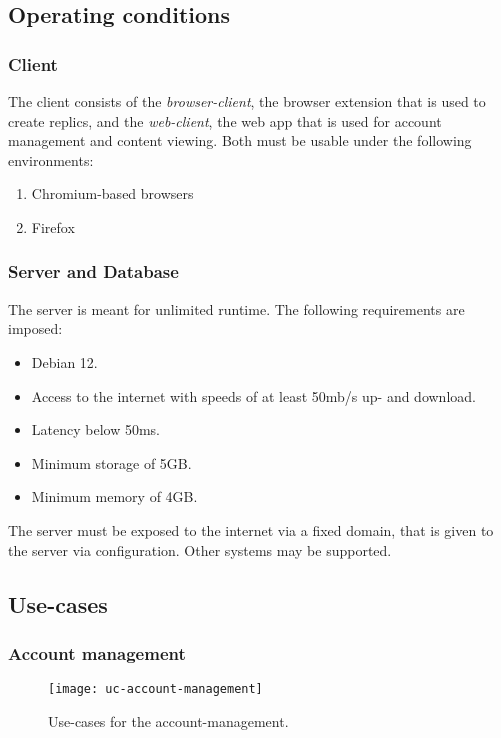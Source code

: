 \subsection{Operating conditions}\label{subsec:operating-conditions}

\subsubsection{Client}
The client consists of the \textit{browser-client}, the browser extension that is used to create replics, and the \textit{web-client}, the web app that is used for account management and content viewing.
Both must be usable under the following environments:

\begin{enumerate}
    \item Chromium-based browsers
    \item Firefox
\end{enumerate}

\subsubsection{Server and Database}
The server is meant for unlimited runtime.
The following requirements are imposed:
\begin{itemize}
    \item Debian 12.
    \item Access to the internet with speeds of at least 50mb/s up- and download.
    \item Latency below 50ms.
    \item Minimum storage of 5GB\@.
    \item Minimum memory of 4GB\@.
\end{itemize}

The server must be exposed to the internet via a fixed domain, that is given to the server via configuration.
Other systems may be supported.

\subsection{Use-cases}\label{subsec:use-cases}

\subsubsection{Account management}
\begin{figure}
    \centering
    \texttt{[image: uc-account-management]}
    \caption{Use-cases for the account-management.}
    \label{fig:account-management}
\end{figure}

